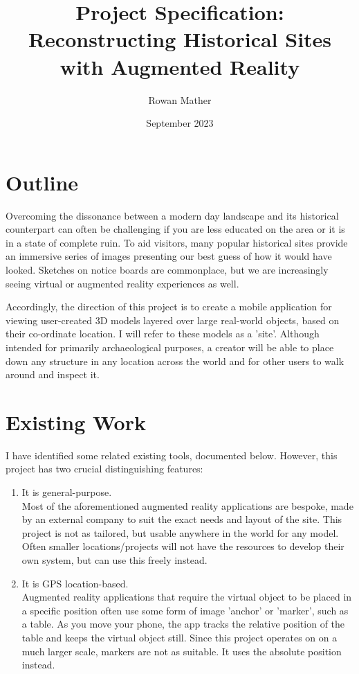 \documentclass{article}
\title{Project Specification: Reconstructing Historical Sites with Augmented Reality}
\author{Rowan Mather}
\date{September 2023}
\begin{document}
\maketitle

\section{Outline}
Overcoming the dissonance between a modern day landscape and its historical counterpart can often be challenging if you are less educated on the area or it is in a state of complete ruin. To aid visitors, many popular historical sites provide an immersive series of images presenting our best guess of how it would have looked. Sketches on notice boards are commonplace, but we are increasingly seeing virtual or augmented reality experiences as well.

Accordingly, the direction of this project is to create a mobile application for viewing user-created 3D models layered over large real-world objects, based on their co-ordinate location. I will refer to these models as a 'site'. Although intended for primarily archaeological purposes, a creator will be able to place down any structure in any location across the world and for other users to walk around and inspect it. 

\section{Existing Work}
I have identified some related existing tools, documented below. However, this project has two crucial distinguishing features:
\begin{enumerate}
    \item It is general-purpose. \\
    Most of the aforementioned augmented reality applications are bespoke, made by an external company to suit the exact needs and layout of the site. This project is not as tailored, but usable anywhere in the world for any model. Often smaller locations/projects will not have the resources to develop their own system, but can use this freely instead.
    \item It is GPS location-based. \\
    Augmented reality applications that require the virtual object to be placed in a specific position often use some form of image 'anchor' or 'marker', such as a table. As you move your phone, the app tracks the relative position of the table and keeps the virtual object still. Since this project operates on on a much larger scale, markers are not as suitable. It uses the absolute position instead.
\end{enumerate}
\end{document}
